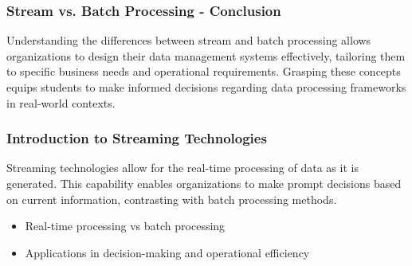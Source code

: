 \documentclass[aspectratio=169]{beamer}
\begin{document}
\begin{frame}[fragile]
    \frametitle{Stream vs. Batch Processing - Conclusion}
    Understanding the differences between stream and batch processing allows organizations to design their data management systems effectively, tailoring them to specific business needs and operational requirements. Grasping these concepts equips students to make informed decisions regarding data processing frameworks in real-world contexts.
\end{frame}

\begin{frame}[fragile]
    \frametitle{Introduction to Streaming Technologies}
    Streaming technologies allow for the real-time processing of data as it is generated. This capability enables organizations to make prompt decisions based on current information, contrasting with batch processing methods. 
    \begin{itemize}
        \item Real-time processing vs batch processing
        \item Applications in decision-making and operational efficiency
    \end{itemize}
\end{frame}
\end{document}
